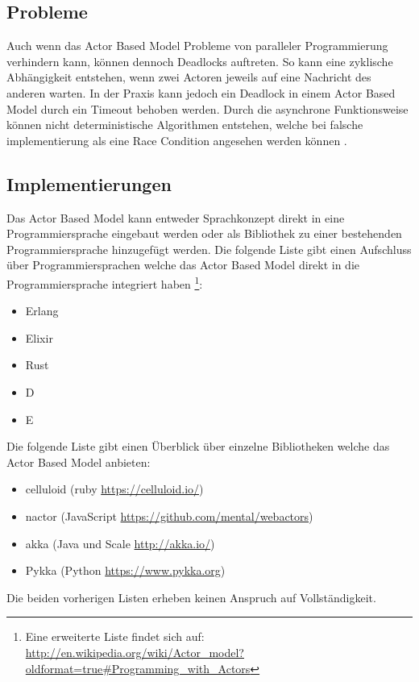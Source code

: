 \subsection{Probleme}
Auch wenn das Actor Based Model Probleme von paralleler Programmierung verhindern kann, können dennoch Deadlocks auftreten. So kann eine zyklische Abhängigkeit entstehen, wenn zwei Actoren jeweils auf eine Nachricht des anderen warten. In der Praxis kann jedoch ein Deadlock in einem Actor Based Model durch ein Timeout behoben werden. Durch die asynchrone Funktionsweise können nicht deterministische Algorithmen entstehen, welche bei falsche implementierung als eine Race Condition angesehen werden können \cite[]{Erb2012}. 

\subsection{Implementierungen}
Das Actor Based Model kann entweder Sprachkonzept direkt in eine Programmiersprache eingebaut werden oder als Bibliothek zu einer bestehenden Programmiersprache hinzugefügt werden. Die folgende Liste gibt einen Aufschluss über Programmiersprachen welche das Actor Based Model direkt in die Programmiersprache integriert haben \footnote{Eine erweiterte Liste findet sich auf: \url{http://en.wikipedia.org/wiki/Actor_model?oldformat=true#Programming_with_Actors}}:

\begin{itemize}
  \item Erlang
  \item Elixir
  \item Rust
  \item D
  \item E
\end{itemize}

Die folgende Liste gibt einen Überblick über einzelne Bibliotheken welche das Actor Based Model anbieten:

\begin{itemize}
  \item celluloid (ruby \url{https://celluloid.io/})
  \item nactor (JavaScript \url{https://github.com/mental/webactors})
  \item akka (Java und Scale \url{http://akka.io/})
  \item Pykka (Python \url{https://www.pykka.org})
\end{itemize}

Die beiden vorherigen Listen erheben keinen Anspruch auf Vollständigkeit. 


